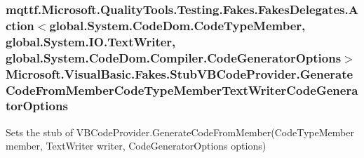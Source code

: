 \hypertarget{class_microsoft_1_1_visual_basic_1_1_fakes_1_1_stub_v_b_code_provider_ac8b0829b524976d97faac50f18757dbd}{
\subsubsection[{Generate\-Code\-From\-Member\-Code\-Type\-Member\-Text\-Writer\-Code\-Generator\-Options}]{\setlength{\rightskip}{0pt plus 5cm}mqttf.\-Microsoft.\-Quality\-Tools.\-Testing.\-Fakes.\-Fakes\-Delegates.\-Action$<$global.\-System.\-Code\-Dom.\-Code\-Type\-Member, global.\-System.\-I\-O.\-Text\-Writer, global.\-System.\-Code\-Dom.\-Compiler.\-Code\-Generator\-Options$>$ Microsoft.\-Visual\-Basic.\-Fakes.\-Stub\-V\-B\-Code\-Provider.\-Generate\-Code\-From\-Member\-Code\-Type\-Member\-Text\-Writer\-Code\-Generator\-Options}}\label{class_microsoft_1_1_visual_basic_1_1_fakes_1_1_stub_v_b_code_provider_ac8b0829b524976d97faac50f18757dbd}


Sets the stub of V\-B\-Code\-Provider.\-Generate\-Code\-From\-Member(\-Code\-Type\-Member member, Text\-Writer writer, Code\-Generator\-Options options)

